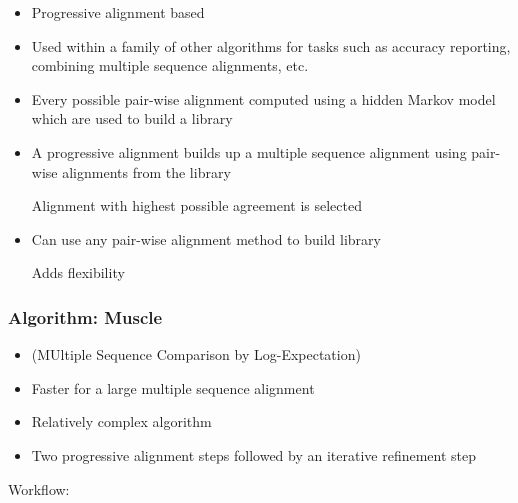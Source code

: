 \documentclass[a4paper]{article}
\begin{document}
\begin{itemize}
  \item
    Progressive alignment based

  \item
    Used within a family of other algorithms for tasks such as accuracy
    reporting, combining multiple sequence alignments, etc.

  \item
    Every possible pair-wise alignment computed using a hidden Markov model
    which are used to build a library

  \item
    A progressive alignment builds up a multiple sequence alignment using
    pair-wise alignments from the library

    Alignment with highest possible agreement is selected

  \item
    Can use any pair-wise alignment method to build library

    Adds flexibility
\end{itemize}

\subsubsection{Algorithm: Muscle}

\begin{itemize}
  \item
    (MUltiple Sequence Comparison by Log-Expectation)

  \item
    Faster for a large multiple sequence alignment

  \item
    Relatively complex algorithm

  \item
    Two progressive alignment steps followed by an iterative refinement step
\end{itemize}

Workflow:
\end{document}
